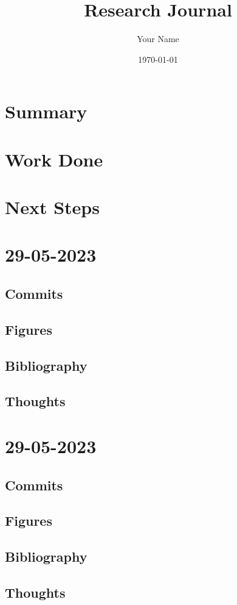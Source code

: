 \documentclass{article}
\begin{document}
\title{Research Journal}
\author{Your Name}
\date{\today}

\maketitle

\section{Summary}

\section{Work Done}

\section{Next Steps}


\section{29-05-2023}
\subsection{Commits}
\subsection{Figures}
\subsection{Bibliography}
\subsection{Thoughts}

\section{29-05-2023}
\subsection{Commits}
\subsection{Figures}
\subsection{Bibliography}
\subsection{Thoughts}
\end{document}
